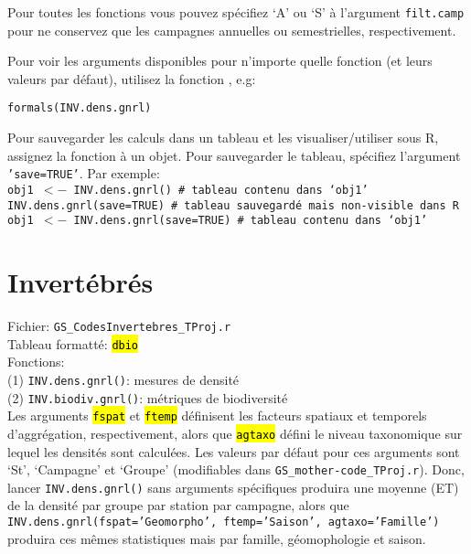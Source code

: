 \documentclass{article}
\begin{document}
Pour toutes les fonctions vous pouvez spécifiez `A' ou `S' à
l'argument \texttt{filt.camp} pour ne conservez que les campagnes
annuelles ou semestrielles, respectivement.

Pour voir les arguments disponibles pour n'importe quelle fonction (et leurs valeurs
par défaut), utilisez la fonction , e.g:

\texttt{formals(INV.dens.gnrl)}


Pour sauvegarder les calculs dans un tableau et les
visualiser/utiliser sous R, assignez la fonction à
un objet. Pour sauvegarder le tableau, spécifiez l'argument
\texttt{'save=TRUE'}. Par exemple: \\

\texttt{obj1 $<-$ INV.dens.gnrl() \# tableau contenu dans `obj1'}\\
\texttt{INV.dens.gnrl(save=TRUE) \# tableau sauvegardé mais non-visible dans R}\\
\texttt{obj1 $<-$ INV.dens.gnrl(save=TRUE) \# tableau contenu dans `obj1'}\\

\section{Invertébrés}

Fichier: \texttt{GS\_CodesInvertebres\_TProj.r}\\
Tableau formatté: \hl{\texttt{dbio}}\\
Fonctions:\\
\indent (1) \texttt{INV.dens.gnrl()}:  mesures de densité\\
\indent (2) \texttt{INV.biodiv.gnrl()}:  métriques de biodiversité\\

Les arguments \hl{\texttt{fspat}} et \hl{\texttt{ftemp}} définisent les facteurs
spatiaux et temporels d'aggrégation, respectivement, alors que
\hl{\texttt{agtaxo}} défini
le niveau taxonomique sur lequel les densités sont calculées. Les
valeurs par défaut pour ces arguments sont
`St', `Campagne' et `Groupe' (modifiables dans
\texttt{GS\_mother-code\_TProj.r}). Donc,
lancer \texttt{INV.dens.gnrl()} sans arguments spécifiques produira une moyenne (ET)
de la densité par groupe par station par campagne, alors que
\texttt{INV.dens.gnrl(fspat='Geomorpho', ftemp='Saison', agtaxo='Famille')}
produira ces mêmes statistiques mais par famille, géomophologie et
saison.
\end{document}

